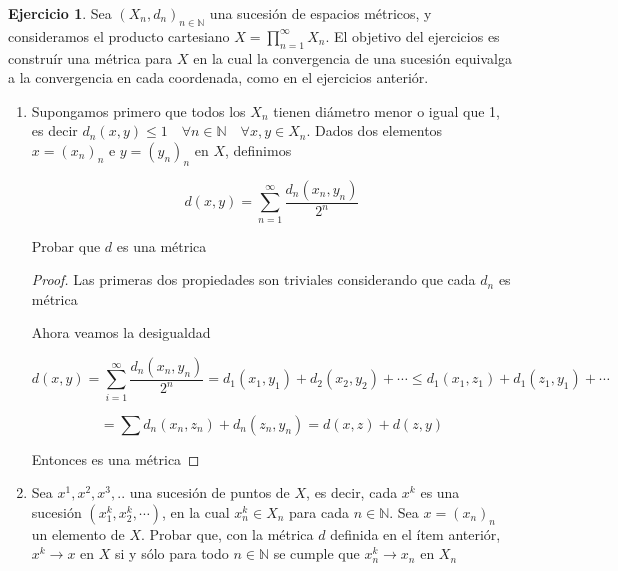 \documentclass[12pt]{article}
\newcommand{\N}{\mathbb{N}}
\newcommand{\ra}{\rightarrow}
\theoremstyle{definition}
\newtheorem{ej}{Ejercicio}
\begin{document}
\begin{ej}
	Sea $(X_n,d_n)_{n \in \N}$ una sucesión de espacios métricos, y consideramos el producto cartesiano $X = \prod_{n =1}^{\infty} X_n$. El objetivo del ejercicios es construír una métrica para $X$ en la cual la convergencia de una sucesión equivalga a la convergencia en cada coordenada, como en el ejercicios anteriór.
	\begin{enumerate}
		\item Supongamos primero que todos los $X_n$ tienen diámetro menor o igual que 1, es decir $d_n(x,y) \leq 1 \quad \forall n\in \N \quad \forall x,y \in X_n$. Dados dos elementos $x = (x_n)_n$ e $y= (y_n)_n$ en $X$, definimos 

			$$ d(x,y) = \sum_{n = 1}^{\infty} \frac{d_n(x_n,y_n)}{2^n}$$

			Probar que $d$ es una métrica
			\begin{proof}
				Las primeras dos propiedades son triviales considerando que cada $d_n$ es métrica

				Ahora veamos la desigualdad

				$$ d(x,y) = \sum_{i = 1}^\infty \frac{d_n(x_n,y_n)}{2^n} = d_1(x_1,y_1) + d_2(x_2,y_2) + \cdots  \leq d_1(x_1,z_1) + d_1(z_1,y_1) + \cdots $$ 

				$$= \sum d_n(x_n,z_n) + d_n(z_n,y_n) = d(x,z) + d(z,y) $$

				Entonces es una métrica
			\end{proof}
		\item Sea $x^1,x^2,x^3,..$ una sucesión de puntos de $X$, es decir, cada $x^k$ es una sucesión $(x_1^k,x_2^k,\cdots)$, en la cual $x_n^k \in X_n$ para cada $n \in \N$. Sea $x = (x_n)_n$ un elemento de $X$. Probar que, con la métrica $d$ definida en el ítem anteriór, $x^k \ra x $ en $X$ si y sólo para todo $n \in \N$ se cumple que $x_n^k \ra x_n $ en $X_n$	
			
	\end{enumerate}
\end{ej}
\end{document}
